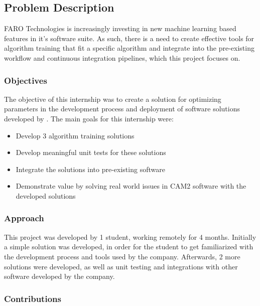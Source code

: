 
\subsection{Problem Description}

FARO Technologies\textsuperscript{\textregistered} is increasingly investing in new machine learning based features in it's software suite. As such, there is a need to create effective tools for algorithm training that fit a specific algorithm and integrate into the pre-existing workflow and continuous integration pipelines, which this project focuses on.

\subsubsection{Objectives}

The objective of this internship was to create a solution for optimizing parameters in the development process and deployment of software solutions developed by \faro. The main goals for this internship were:

\begin{itemize}
	\item Develop 3 algorithm training solutions
	\item Develop meaningful unit tests for these solutions
	\item Integrate the solutions into pre-existing software
	\item Demonstrate value by solving real world issues in CAM2\textsuperscript{\textregistered} software with the developed solutions
\end{itemize}

\subsubsection{Approach}

This project was developed by 1 student, working remotely for 4 months. Initially a simple solution was developed, in order for the student to get familiarized with the development process and tools used by the company. Afterwards, 2 more solutions were developed, as well as unit testing and integrations with other software developed by the company.

\subsubsection{Contributions}

